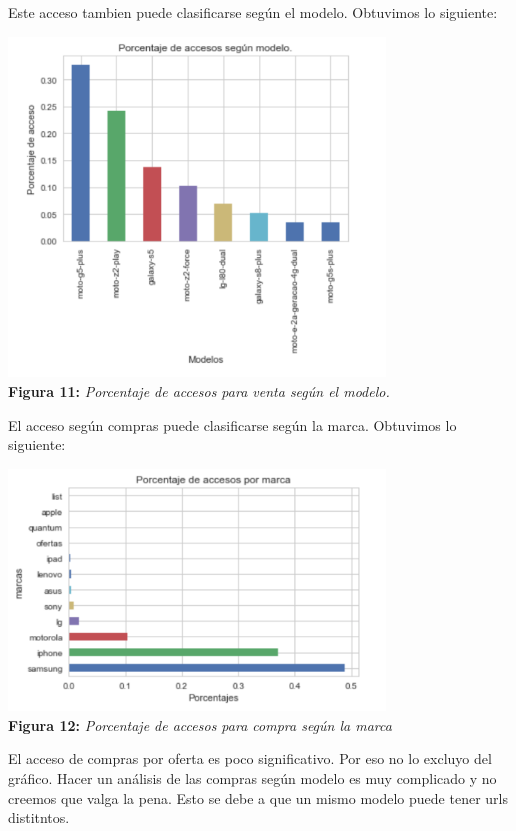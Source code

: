 \documentclass[titlepage,a4paper]{article}
\begin{document}
	Este acceso tambien puede clasificarse según el modelo. Obtuvimos lo siguiente:
	\begin{center}
	\includegraphics[width=10cm] {porcentajeDeAccesosSegunModelo.jpg}\\
	\textbf{Figura 11:}  \textit{Porcentaje de accesos para venta según el modelo.}
	\end{center}
	El acceso según compras puede clasificarse según la marca. Obtuvimos lo siguiente:
	\begin{center}
	\includegraphics[width=10cm] {porcentajeDeAccesosPorMarcaSegunCompras.jpg}\\
	\textbf{Figura 12:}  \textit{Porcentaje de accesos para compra según la marca}
	\end{center}
	El acceso de compras por oferta es poco significativo. Por eso no lo excluyo del gráfico. 
	Hacer un análisis de las compras según modelo es muy complicado y no creemos que valga la pena. Esto se debe a que un mismo modelo puede tener urls distitntos. 
\end{document}
